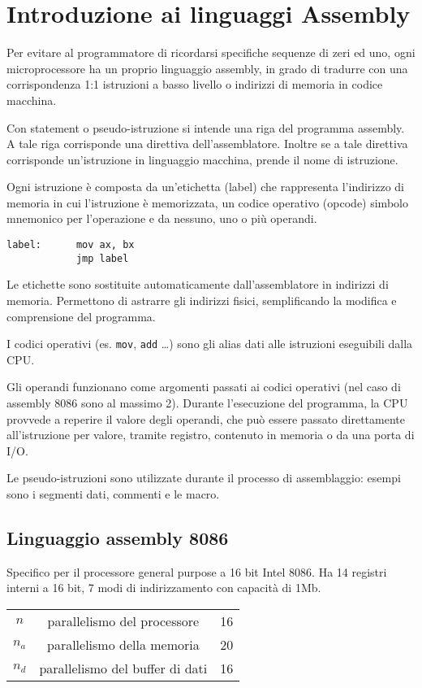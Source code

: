 \documentclass[../template]{subfiles}
\begin{document}
\section{Introduzione ai linguaggi Assembly}
Per evitare al programmatore di ricordarsi specifiche sequenze di zeri ed uno, ogni microprocessore ha un proprio
linguaggio assembly, in grado di tradurre con una corrispondenza 1:1 istruzioni a basso livello o indirizzi di memoria
in codice macchina.

Con statement o pseudo-istruzione si intende una riga del programma assembly. A tale riga corrisponde una direttiva
dell'assemblatore.  Inoltre se a tale direttiva corrisponde un'istruzione in linguaggio macchina, prende il nome di
istruzione.

Ogni istruzione è composta da un'etichetta (label) che rappresenta l'indirizzo di memoria in cui l'istruzione è
memorizzata, un codice operativo (opcode) simbolo mnemonico per l'operazione e da nessuno, uno o più operandi.

\begin{lstlisting}
label:      mov ax, bx
            jmp label
\end{lstlisting}

Le etichette sono sostituite automaticamente dall'assemblatore in indirizzi di memoria. Permettono di astrarre gli
indirizzi fisici, semplificando la modifica e comprensione del programma.

I codici operativi (es. \lstinline{mov}, \lstinline{add} \dots) sono gli alias dati alle istruzioni eseguibili dalla
CPU.

Gli operandi funzionano come argomenti passati ai codici operativi (nel caso di assembly 8086 sono al massimo 2).
Durante l'esecuzione del programma, la CPU provvede a reperire il valore degli operandi, che può essere passato
direttamente all'istruzione per valore, tramite registro, contenuto in memoria o da una porta di I/O.


Le pseudo-istruzioni sono utilizzate durante il processo di assemblaggio: esempi sono i segmenti dati, commenti  e le
macro.
\subsection{Linguaggio assembly 8086}
Specifico per il processore general purpose a 16 bit Intel 8086.
Ha 14 registri interni a 16 bit, 7 modi di indirizzamento con capacità di 1Mb.

\begin{tabular}{|c|c|c|}
    \hline
$n$   & parallelismo del processore & 16\\
$n_a$ & parallelismo della memoria & 20\\
$n_d$ & parallelismo del buffer di dati & 16\\
\hline
\end{tabular}
\end{document}
